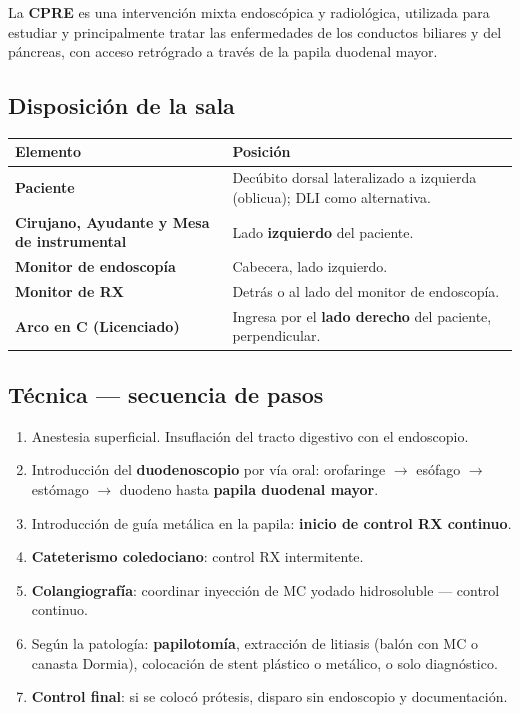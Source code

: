 \begin{cajadefinicion}
	La \textbf{CPRE} es una intervención mixta endoscópica y radiológica, utilizada para estudiar y principalmente tratar las enfermedades de los conductos biliares y del páncreas, con acceso retrógrado a través de la papila duodenal mayor.
\end{cajadefinicion}

\subsection*{Disposición de la sala}

{\renewcommand{\arraystretch}{1.25}
	\begin{center}
		\begin{tabular}{>{\bfseries}p{4cm} p{9.5cm}}
			\hline
			Elemento & Posición \\
			\hline
			Paciente & Decúbito dorsal lateralizado a izquierda (oblicua); DLI como alternativa. \\[0.3em]
			\hline
			Cirujano, Ayudante y Mesa de instrumental & Lado \textbf{izquierdo} del paciente. \\[0.3em]
			\hline
			Monitor de endoscopía & Cabecera, lado izquierdo. \\[0.3em]
			\hline
			Monitor de RX & Detrás o al lado del monitor de endoscopía. \\[0.3em]
			\hline
			Arco en C (Licenciado) & Ingresa por el \textbf{lado derecho} del paciente, perpendicular. \\
			\hline
		\end{tabular}
	\end{center}
}

\subsection*{Técnica --- secuencia de pasos}

\begin{enumerate}[noitemsep]
	\item Anestesia superficial. Insuflación del tracto digestivo con el endoscopio.
	\item Introducción del \textbf{duodenoscopio} por vía oral: orofaringe $\to$ esófago $\to$ estómago $\to$ duodeno hasta \textbf{papila duodenal mayor}.
	\item Introducción de guía metálica en la papila: \textbf{inicio de control RX continuo}.
	\item \textbf{Cateterismo coledociano}: control RX intermitente.
	\item \textbf{Colangiografía}: coordinar inyección de MC yodado hidrosoluble --- control continuo.
	\item Según la patología: \textbf{papilotomía}, extracción de litiasis (balón con MC o canasta Dormia), colocación de stent plástico o metálico, o solo diagnóstico.
	\item \textbf{Control final}: si se colocó prótesis, disparo sin endoscopio y documentación.
\end{enumerate}


